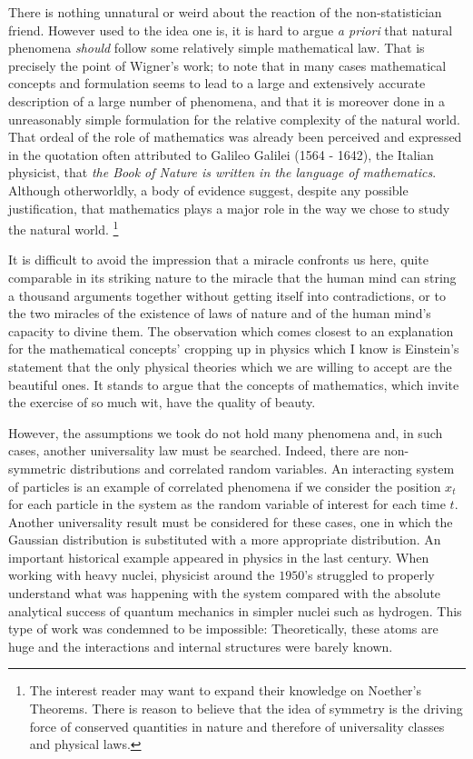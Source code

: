 There is nothing unnatural or weird about the reaction of the non-statistician friend. However used to the idea one is, it is hard to argue \textit{a priori} that natural phenomena \textit{should} follow some relatively simple mathematical law. That is precisely the point of Wigner's work; to note that in many cases mathematical concepts and formulation seems to lead to a large and extensively accurate description of a large number of phenomena, and that it is moreover done in a unreasonably simple formulation for the relative complexity of the natural world. That ordeal of the role of mathematics was already been perceived and expressed in the quotation often attributed to Galileo Galilei (1564 - 1642), the Italian physicist, that \textit{the Book of Nature is written in the language of mathematics}. Although otherworldly, a body of evidence suggest, despite any possible justification, that mathematics plays a major role in the way we chose to study the natural world. \footnote{The interest reader may want to expand their knowledge on Noether's Theorems. There is reason to believe that the idea of symmetry is the driving force of conserved quantities in nature and therefore of universality classes and physical laws.}

\begin{citacao}
	It is difficult to avoid the impression that a miracle confronts us here, quite comparable in its striking nature to the miracle that the human mind can string a thousand arguments together without
	getting itself into contradictions, or to the two miracles of the existence of laws of nature and of the human mind’s capacity to divine them. The observation which comes closest to an explanation for	the mathematical concepts’ cropping up in physics which I know is Einstein’s statement that the only physical theories which we are willing to accept are the beautiful ones. It stands to argue that	the concepts of mathematics, which invite the exercise of so much wit, have the quality of beauty. \cite{Wigner1995}
\end{citacao} 

However, the assumptions we took do not hold many phenomena and, in such cases, another universality law must be searched. Indeed, there are non-symmetric distributions and correlated random variables. An interacting system of particles is an example of correlated phenomena if we consider the position $x_t$ for each particle in the system as the random variable of interest for each time $t$. Another universality result must be considered for these cases, one in which the Gaussian distribution is substituted with a more appropriate distribution. An important historical example appeared in physics in the last century. When working with heavy nuclei, physicist around the $1950$'s struggled to properly understand what was happening with the system compared with the absolute analytical success of quantum mechanics in simpler nuclei such as hydrogen. This type of work was condemned to be impossible: Theoretically, these atoms are huge and the interactions and internal structures were barely known.

